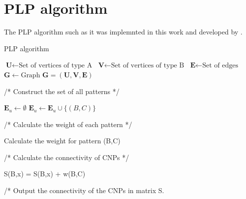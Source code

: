 \chapter{PLP algorithm}\label{ap:plp}
The PLP algorithm such as it was implemnted in this work and developed by \citet{plp}.


\makeatletter
\def\BState{\State\hskip-\ALG@thistlm}
\makeatother

\begin{algorithm}
\caption{PLP algorithm}

\begin{algorithmic}

\State $ \textbf{U} \gets \text{Set of vertices of type A}$
\State $ \textbf{V} \gets \text{Set of vertices of type B}$
\State $ \textbf{E} \gets \text{Set of edges}$
\State $ \textbf{G} \gets \text{Graph }\textbf{G}=(\textbf{U},\textbf{V},\textbf{E})$

\State /* Construct the set of all patterns */

\State $ \textbf{E}_u \gets \emptyset$
            \State $\textbf{E}_u \gets \textbf{E}_u \cup \{(B,C)\}$
        \EndFor
    \EndFor
\EndFor

\State /* Calculate the weight of each pattern */

    \State Calculate the weight for pattern (B,C)
\EndFor

\State /* Calculate the connectivity of CNPs */

                \State S(B,x) = S(B,x) + w(B,C)
            \EndIf
        \EndFor
    \EndFor
\EndFor

\State /* Output the connectivity of the CNPs in matrix S.

\end{algorithmic}
\end{algorithm}

\newpage

